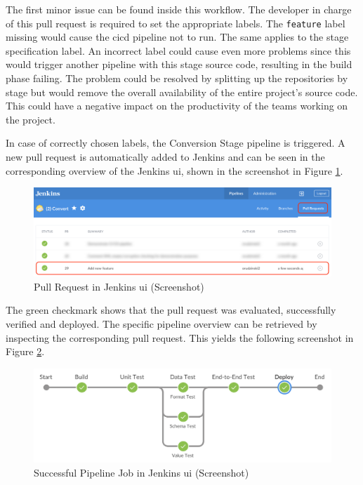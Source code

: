 The first minor issue can be found inside this workflow. The developer in charge of this pull request is required to set the appropriate labels. The \texttt{feature} label missing would cause the \ac{cicd} pipeline not to run. The same applies to the stage specification label. An incorrect label could cause even more problems since this would trigger another pipeline with this stage source code, resulting in the build phase failing. The problem could be resolved by splitting up the repositories by stage but would remove the overall availability of the entire project's source code. This could have a negative impact on the productivity of the teams working on the project.

In case of correctly chosen labels, the Conversion Stage pipeline is triggered. A new pull request is automatically added to Jenkins and can be seen in the corresponding overview of the Jenkins \acs{ui}, shown in the screenshot in Figure \ref{fig:6-jenkins-pr}.

\begin{figure}[h!]
	\centering
	\includegraphics[width=\linewidth]{main-matter/img/6-jenkins-pr}
	\caption{Pull Request in Jenkins \acs{ui} (Screenshot)}
	\label{fig:6-jenkins-pr}
\end{figure}

The green checkmark shows that the pull request was evaluated, successfully verified and deployed. The specific pipeline overview can be retrieved by inspecting the corresponding pull request. This yields the following screenshot in Figure \ref{fig:6-jenkins-job-success}.

\begin{figure}[h!]
	\centering
	\includegraphics[width=\linewidth]{main-matter/img/6-jenkins-job-success}
	\caption{Successful Pipeline Job in Jenkins \acs{ui} (Screenshot)}
	\label{fig:6-jenkins-job-success}
\end{figure}

